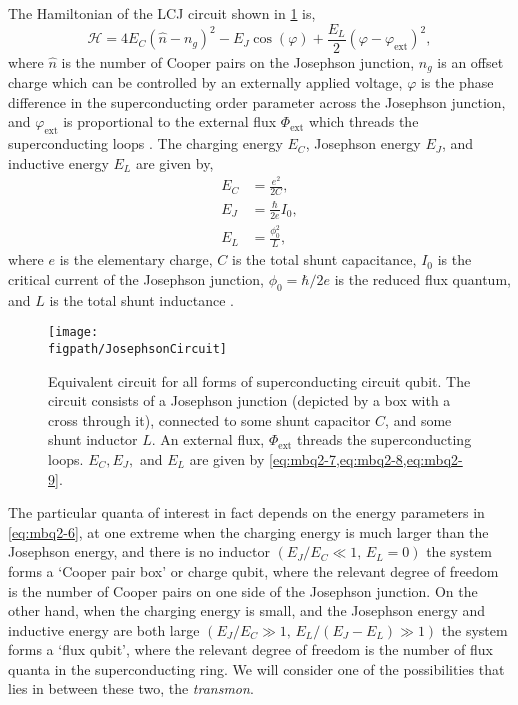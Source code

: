 The Hamiltonian of the LCJ circuit shown in \cref{fig:mbq2-2} is,
\begin{equation}
	\mathcal{H} = 4E_{C}(\hat{n} - n_{g})^{2} - E_{J}\cos(\varphi) + \frac{E_{L}}{2} (\varphi - \varphi_{\mathrm{ext}})^{2},
	\label{eq:mbq2-6}
\end{equation}
where \(\hat{n}\) is the number of Cooper pairs on the Josephson junction, \(n_{g}\) is an offset charge which can be controlled by an externally applied voltage, \(\varphi\) is the phase difference in the superconducting order parameter across the Josephson junction, and \(\varphi_{\mathrm{ext}}\) is proportional to the external flux \(\Phi_{\mathrm{ext}}\) which threads the superconducting loops \cite{Vool2017}. The charging energy \(E_{C}\), Josephson energy \(E_{J}\), and inductive energy \(E_{L}\) are given by,
\begin{align}
	E_{C} &= \frac{e^{2}}{2C}, \label{eq:mbq2-7} \\
	E_{J} &= \frac{\hbar}{2e}I_{0}, \label{eq:mbq2-8} \\
	E_{L} &= \frac{\phi_{0}^{2}}{L}, \label{eq:mbq2-9}
\end{align}
where \(e\) is the elementary charge, \(C\) is the total shunt capacitance, \(I_{0}\) is the critical current of the Josephson junction, \(\phi_{0} = \hbar/2e\) is the reduced flux quantum, and \(L\) is the total shunt inductance \cite{Vool2017,Wendin2017}.

\begin{figure}[ht!]
\centering
\texttt{[image: \\figpath/JosephsonCircuit]}
\caption{\label{fig:mbq2-2}Equivalent circuit for all forms of superconducting circuit qubit. The circuit consists of a Josephson junction (depicted by a box with a cross through it), connected to some shunt capacitor \(C\), and some shunt inductor \(L\). An external flux, \(\Phi_{\mathrm{ext}}\) threads the superconducting loops. \(E_{C}, E_{J},\) and \(E_{L}\) are given by \cref{eq:mbq2-7,eq:mbq2-8,eq:mbq2-9}.}
\end{figure}

The particular quanta of interest in fact depends on the energy parameters in \cref{eq:mbq2-6}, at one extreme when the charging energy is much larger than the Josephson energy, and there is no inductor \((E_{J} / E_{C} \ll 1,\, E_{L} = 0)\) the system forms a `Cooper pair box' or charge qubit, where the relevant degree of freedom is the number of Cooper pairs on one side of the Josephson junction. On the other hand, when the charging energy is small, and the Josephson energy and inductive energy are both large \(( E_{J} / E_{C} \gg 1,\, E_{L} / (E_{J}-E_{L}) \gg 1 )\) the system forms a `flux qubit', where the relevant degree of freedom is the number of flux quanta in the superconducting ring. We will consider one of the possibilities that lies in between these two, the \emph{transmon}.

